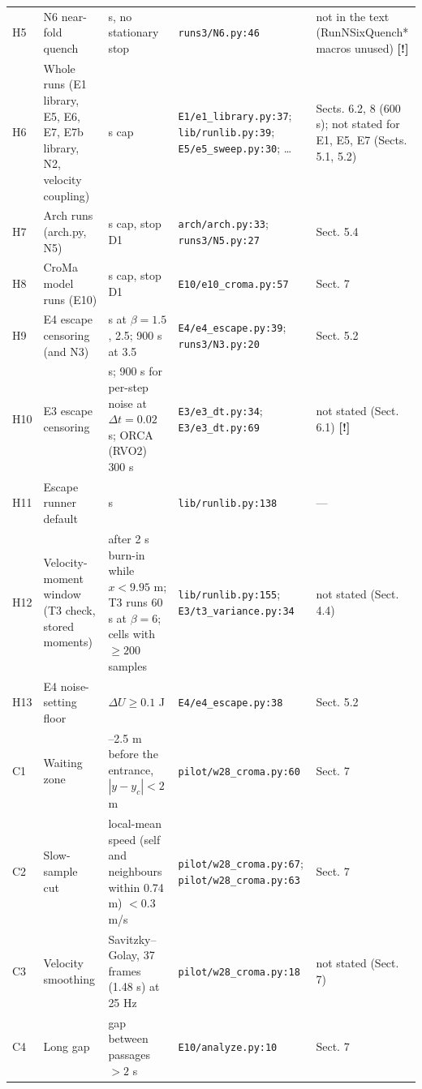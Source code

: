 \begin{tabular}{@{}l>{\raggedright\arraybackslash}p{3.2cm}>{\raggedright\arraybackslash}p{4.6cm}>{\raggedright\arraybackslash}p{3.4cm}>{\raggedright\arraybackslash}p{2.6cm}@{}}
H5 & N6 near-fold quench & 300 s, no stationary stop & \texttt{runs3/N6.py:46} & not in the text (RunNSixQuench* macros unused) \textbf{[!]} \\
H6 & Whole runs (E1 library, E5, E6, E7, E7b library, N2, velocity coupling) & 600 s cap & \texttt{E1/e1\_library.py:37}; \texttt{lib/runlib.py:39}; \texttt{E5/e5\_sweep.py:30}; \ldots & Sects. 6.2, 8 (600 s); not stated for E1, E5, E7 (Sects. 5.1, 5.2) \\
H7 & Arch runs (arch.py, N5) & 600 s cap, stop D1 & \texttt{arch/arch.py:33}; \texttt{runs3/N5.py:27} & Sect. 5.4 \\
H8 & CroMa model runs (E10) & 600 s cap, stop D1 & \texttt{E10/e10\_croma.py:57} & Sect. 7 \\
H9 & E4 escape censoring (and N3) & 300 s at $\beta=1.5$, 2.5; 900 s at 3.5 & \texttt{E4/e4\_escape.py:39}; \texttt{runs3/N3.py:20} & Sect. 5.2 \\
H10 & E3 escape censoring & 300 s; 900 s for per-step noise at $\Delta t=0.02$ s; ORCA (RVO2) 300 s & \texttt{E3/e3\_dt.py:34}; \texttt{E3/e3\_dt.py:69} & not stated (Sect. 6.1) \textbf{[!]} \\
H11 & Escape runner default & 300 s & \texttt{lib/runlib.py:138} & --- \\
H12 & Velocity-moment window (T3 check, stored moments) & after 2 s burn-in while $x<9.95$ m; T3 runs 60 s at $\beta=6$; cells with $\ge200$ samples & \texttt{lib/runlib.py:155}; \texttt{E3/t3\_variance.py:34} & not stated (Sect. 4.4) \\
H13 & E4 noise-setting floor & $\Delta U\ge0.1$ J & \texttt{E4/e4\_escape.py:38} & Sect. 5.2 \\
\addlinespace
C1 & Waiting zone & 0.3--2.5 m before the entrance, $|y-y_c|<2$ m & \texttt{pilot/w28\_croma.py:60} & Sect. 7 \\
C2 & Slow-sample cut & local-mean speed (self and neighbours within 0.74 m) $<0.3$ m/s & \texttt{pilot/w28\_croma.py:67}; \texttt{pilot/w28\_croma.py:63} & Sect. 7 \\
C3 & Velocity smoothing & Savitzky--Golay, 37 frames (1.48 s) at 25 Hz & \texttt{pilot/w28\_croma.py:18} & not stated (Sect. 7) \\
C4 & Long gap & gap between passages $>2$ s & \texttt{E10/analyze.py:10} & Sect. 7 \\
\bottomrule
\end{tabular}
